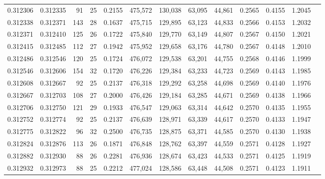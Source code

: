 \begin{tabular}{rrrrrrrrrrrrr}
0.312306 & 0.312335 &    91 &  25 &                                     0.2155 & 475,572 & 130,038 &  63,095 &  44,861 & 0.2565 & 0.4155 & 1.2045 \\
0.312338 & 0.312371 &   143 &  28 &                                     0.1637 & 475,715 & 129,895 &  63,123 &  44,833 & 0.2566 & 0.4153 & 1.2032 \\
0.312371 & 0.312410 &   125 &  26 &                                     0.1722 & 475,840 & 129,770 &  63,149 &  44,807 & 0.2567 & 0.4150 & 1.2021 \\
0.312415 & 0.312485 &   112 &  27 &                                     0.1942 & 475,952 & 129,658 &  63,176 &  44,780 & 0.2567 & 0.4148 & 1.2010 \\
0.312486 & 0.312546 &   120 &  25 &                                     0.1724 & 476,072 & 129,538 &  63,201 &  44,755 & 0.2568 & 0.4146 & 1.1999 \\
0.312546 & 0.312606 &   154 &  32 &                                     0.1720 & 476,226 & 129,384 &  63,233 &  44,723 & 0.2569 & 0.4143 & 1.1985 \\
0.312608 & 0.312667 &    92 &  25 &                                     0.2137 & 476,318 & 129,292 &  63,258 &  44,698 & 0.2569 & 0.4140 & 1.1976 \\
0.312667 & 0.312703 &   108 &  27 &                                     0.2000 & 476,426 & 129,184 &  63,285 &  44,671 & 0.2569 & 0.4138 & 1.1966 \\
0.312706 & 0.312750 &   121 &  29 &                                     0.1933 & 476,547 & 129,063 &  63,314 &  44,642 & 0.2570 & 0.4135 & 1.1955 \\
0.312752 & 0.312774 &    92 &  25 &                                     0.2137 & 476,639 & 128,971 &  63,339 &  44,617 & 0.2570 & 0.4133 & 1.1947 \\
0.312775 & 0.312822 &    96 &  32 &                                     0.2500 & 476,735 & 128,875 &  63,371 &  44,585 & 0.2570 & 0.4130 & 1.1938 \\
0.312824 & 0.312876 &   113 &  26 &                                     0.1871 & 476,848 & 128,762 &  63,397 &  44,559 & 0.2571 & 0.4128 & 1.1927 \\
0.312882 & 0.312930 &    88 &  26 &                                     0.2281 & 476,936 & 128,674 &  63,423 &  44,533 & 0.2571 & 0.4125 & 1.1919 \\
0.312932 & 0.312973 &    88 &  25 &                                     0.2212 & 477,024 & 128,586 &  63,448 &  44,508 & 0.2571 & 0.4123 & 1.1911 \\

\end{tabular}
